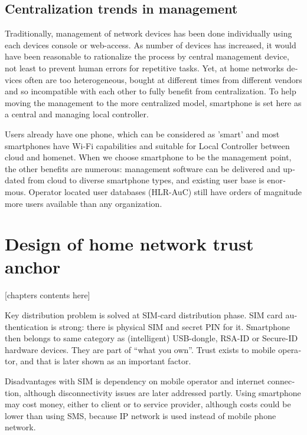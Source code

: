 \documentclass[12pt,a4paper,english]{tutthesis}
\begin{document}
\begin{otherlanguage}{english}
\section{Centralization trends in management}
\label{sec-3-2}

Traditionally, management of network devices has been done
individually using each devices console or web-access.  As number of
devices has increased, it would have been reasonable to rationalize
the process by central management device, not least to prevent human
errors for repetitive tasks.  Yet, at home networks devices often are
too heterogeneous, bought at different times from different vendors
and so incompatible with each other to fully benefit from
centralization. To help moving the management to the more centralized
model, smartphone is set here as a central and managing local
controller.

Users already have one phone, which can be considered as
'smart' and most smartphones have Wi-Fi capabilities and suitable for 
Local Controller between cloud and homenet.
When we choose smartphone to be the management point, the other benefits are
numerous:  management software can be delivered and
updated from cloud to diverse smartphone types, and existing user
base is enormous.
Operator located user databases (HLR-AuC) still have orders of
magnitude more users available than any organization. 



\chapter{Design of home network trust anchor}
\label{sec-4}




[chapters contents here]

Key distribution problem is solved at SIM-card distribution phase.
SIM card authentication is strong: there is physical SIM and secret PIN for it.
Smartphone then belongs to same category as (intelligent) USB-dongle,
RSA-ID or Secure-ID hardware devices.  They are part of ``what you own''.
Trust exists to mobile operator, and that is later shown as an
important factor. 



Disadvantages with SIM is dependency on mobile operator and internet
connection, although disconnectivity issues are later addressed partly.
Using smartphone may cost money, either to client or to service
provider, although costs could be lower than using SMS, because 
IP network is used instead of mobile
phone network.



\end{otherlanguage}
\end{document}
